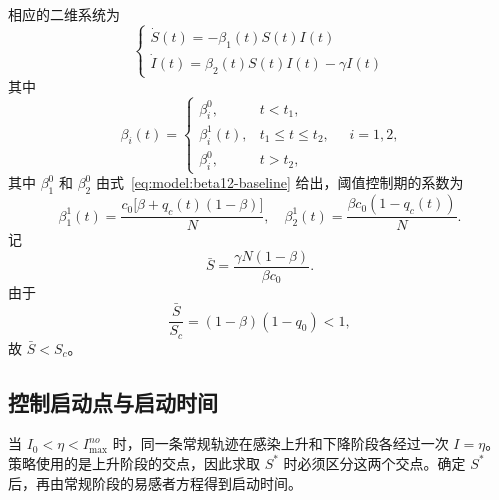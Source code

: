 \documentclass[lang=cn,a4paper,newtx]{elegantpaper}
\numberwithin{equation}{section}
\theoremstyle{plain}
\begin{document}
相应的二维系统为
\begin{equation}
\begin{cases}
\dot{S}(t) = - \beta_1(t) S(t) I(t) \\
\dot{I}(t) = \beta_2(t) S(t) I(t) - \gamma I(t)
\end{cases}
\label{eq:s1:dynamics}
\end{equation}
其中
\begin{equation}
\beta_i(t)=
\begin{cases}
\beta_i^0, & t<t_1,\\
\beta_i^1(t), & t_1\le t\le t_2,\\
\beta_i^0, & t>t_2,
\end{cases}
\quad i=1,2,
\end{equation}
其中 $\beta_1^0$ 和 $\beta_2^0$ 由式~\eqref{eq:model:beta12-baseline} 给出，阈值控制期的系数为
\begin{equation}
\beta_1^1(t)=\frac{c_0\big[\beta+q_c(t)(1-\beta)\big]}{N},
\quad
\beta_2^1(t)=\frac{\beta c_0(1-q_c(t))}{N}.
\label{eq:s1:beta12-control}
\end{equation}
记
\begin{equation}
\bar S
=
\frac{\gamma N(1-\beta)}{\beta c_0}.
\label{eq:s1:barS}
\end{equation}
由于
\[
\frac{\bar S}{S_c}
=
(1-\beta)(1-q_0)<1,
\]
故 $\bar S<S_c$。

\subsection{控制启动点与启动时间}
当 $I_0<\eta<I_{\max}^{no}$ 时，同一条常规轨迹在感染上升和下降阶段各经过一次 $I=\eta$。策略使用的是上升阶段的交点，因此求取 $S^*$ 时必须区分这两个交点。确定 $S^*$ 后，再由常规阶段的易感者方程得到启动时间。
\end{document}
